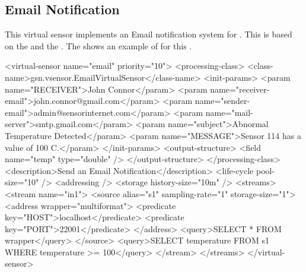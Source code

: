 \subsection{Email Notification \vs \label{quickref_email_notification_vs}}

This virtual sensor implements an Email notification system for \gsn. 
This \vs is based on the  \vsp and the  \wrapper.
The  shows an example of \vsd for this \vs.

\begin{xmlcode}[caption={Sample of Email Notification VSD file}, label=listing:xml:emailnotification_vsd]
<virtual-sensor name="email" priority="10">
	<processing-class>
		<class-name>gsn.vsensor.EmailVirtualSensor</class-name>
		<init-params>
			<param name="RECEIVER">John Connor</param>
			<param name="receiver-email">john.connor@gmail.com</param>
			<param name="sender-email">admin@sensorinternet.com</param>
			<param name="mail-server">smtp.gmail.com</param>
			<param name="subject">Abnormal Temperature Detected</param>
			<param name="MESSAGE">Sensor 114 has a value of 100 C.</param>   
		</init-params>
		<output-structure>
			<field name="temp" type="double" />
		</output-structure>
	</processing-class>
	<description>Send an Email Notification</description>
	<life-cycle pool-size="10" />
	<addressing />
	<storage history-size="10m" />
	<streams>
		<stream name="in1">
			<source alias="s1" sampling-rate="1" storage-size="1">
				<address wrapper="multiformat">
					<predicate key="HOST">localhost</predicate>
					<predicate key="PORT">22001</predicate>
				</address>
				<query>SELECT * FROM wrapper</query>
			</source>
			<query>SELECT temperature FROM s1 WHERE temperature >= 100</query>
		</stream>
	</streams>
</virtual-sensor>
\end{xmlcode}

